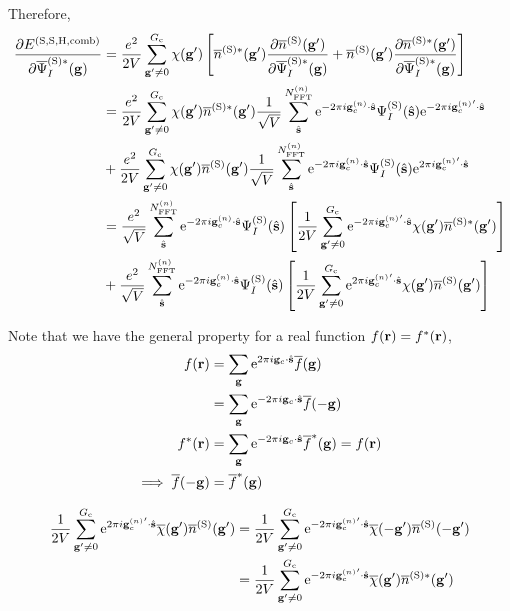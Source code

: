 \documentclass[paper=a4, fontsize=11pt]{article} %
\numberwithin{equation}{section} %
\numberwithin{figure}{section} %
\numberwithin{table}{section} %
\newcommand{\p}{\partial}
\newcommand{\ol}{\overline}
\newcommand{\bs}{{\bf{s}}}
\newcommand{\bg}{{\bf{g}}}
\newcommand{\br}{{\bf{r}}}
\newcommand{\rS}{{\mathrm{S}}}
\newcommand{\re}{{\mathrm{e}}}
\newcommand{\rH}{{\mathrm{H}}}
\newcommand{\rcomb}{{\mathrm{comb}}}
\newcommand{\gc}{{\bg_c}}
\newcommand{\gcn}{{\bg_c^{(n)}}}
\newcommand{\igcs}{2\pi i\gc\cdot\hat \bs}
\newcommand{\igcns}{2\pi i\gcn\cdot\hat \bs}
\newcommand{\igpcns}{2\pi i\gcn'\cdot\hat \bs}
\newcommand{\psigsc}{{\overline \Psi_I^{(\rS)*}(\bg)}}
\newcommand{\NFFTn}{{N^{(n)}_{\mathrm{FFT}}}}
\newcommand{\Gc}{{G_{\mathrm{c}}}}
\begin{document}
Therefore,
\begin{equation}
\begin{split}
\frac{\p E^{(\rS,\rS,\rH,\rcomb)}}{\p \psigsc}
&= \frac{e^2}{2V} \sum_{\bg' \neq 0}^\Gc \chi(\bg') \left[\overline{n}^{(\rS)*}(\bg') \frac{\p  \overline{n}^{(\rS)}(\bg')}{\p \psigsc} + \overline{n}^{(\rS)}(\bg') \frac{\p \overline{n}^{(\rS)*}(\bg')}{\p \psigsc}  \right]\\
&= \frac{e^2}{2V} \sum_{\bg' \neq 0}^\Gc \chi(\bg') \overline{n}^{(\rS)*}(\bg') \frac{1}{\sqrt V} \sum_{\hat \bs}^\NFFTn   \re^{-\igcns}\Psi_{I}^{(\rS)}(\hat \bs) \re^{-\igpcns} \\
&+ \frac{e^2}{2V} \sum_{\bg' \neq 0}^\Gc \chi(\bg') \overline{n}^{(\rS)}(\bg') \frac{1}{\sqrt V} \sum_{\hat \bs}^\NFFTn   \re^{-\igcns}\Psi_{I}^{(\rS)}(\hat \bs) \re^{\igpcns} \\
&= \frac{e^2}{\sqrt V} \sum_{\hat \bs}^\NFFTn   \re^{-\igcns}\Psi_{I}^{(\rS)} (\hat \bs) \left[\frac{1}{2V} \sum_{\bg' \neq 0}^\Gc \re^{-\igpcns} \chi(\bg') \overline{n}^{(\rS)*}(\bg')\right]\\
&+ \frac{e^2}{\sqrt V} \sum_{\hat \bs}^\NFFTn   \re^{-\igcns}\Psi_{I}^{(\rS)} (\hat \bs) \left[\frac{1}{2V} \sum_{\bg' \neq 0}^\Gc \re^{\igpcns} \chi(\bg') \overline{n}^{(\rS)}(\bg')\right]\\
\end{split}
\end{equation}



Note that we have the general property for a real function $f(\br) = f^*(\br)$,
\begin{equation}
\begin{split}
f(\br) &= \sum_\bg \re^{\igcs} \ol f(\bg) \\
&= \sum_\bg \re^{-\igcs} \ol f(-\bg) \\
f^*(\br) &= \sum_\bg \re^{-\igcs} \ol f^*(\bg) = f(\br) \\
\implies \ol f(-\bg) &=  \ol f^*(\bg) 
\end{split}
\end{equation}

\begin{equation}
\begin{split}
\frac{1}{2V} \sum_{\bg' \neq 0}^\Gc \re^{\igpcns} \ol \chi(\bg') \overline{n}^{(\rS)}(\bg') 
&= \frac{1}{2V} \sum_{\bg' \neq 0}^\Gc \re^{-\igpcns} \ol \chi(-\bg') \overline{n}^{(\rS)}(-\bg') \\
&= \frac{1}{2V} \sum_{\bg' \neq 0}^\Gc \re^{-\igpcns} \ol \chi(\bg') \overline{n}^{(\rS)*}(\bg')
\end{split}
\end{equation}
\end{document}
